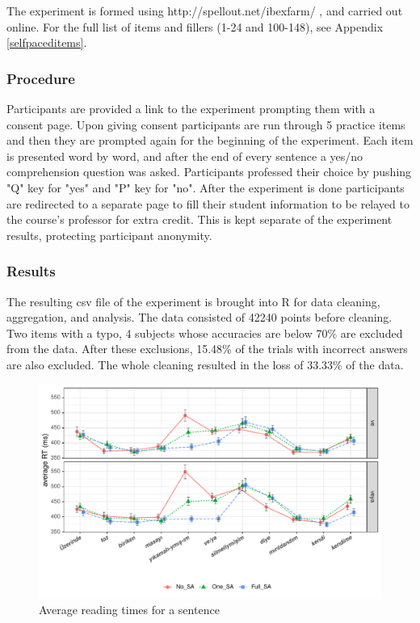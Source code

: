 The experiment is formed using http://spellout.net/ibexfarm/ \citep{drummond2013ibex}, and carried out online. For the full list of items and fillers (1-24 and 100-148), see Appendix \ref{selfpaceditems}.

\subsubsection{Procedure}
Participants are provided a link to the experiment prompting them with a consent page. Upon giving consent participants are run through 5 practice items and then they are prompted again for the beginning of the experiment. Each item is presented word by word, and after the end of every sentence a yes/no comprehension question was asked. Participants professed their choice by pushing "Q" key for "yes" and "P" key for "no". After the experiment is done participants are redirected to a separate page to fill their student information to be relayed to the course's professor for extra credit. This is kept separate of the experiment results, protecting participant anonymity.

\subsubsection{Results}
The resulting csv file of the experiment is brought into R \citep{team2013r} for data cleaning, aggregation, and analysis.
The data consisted of 42240 points before cleaning. Two items with a typo, 4 subjects whose accuracies are below 70\% are excluded from the data. After these exclusions, 15.48\% of the trials with incorrect answers are also excluded. The whole cleaning resulted in the loss of 33.33\% of the data.

\begin{figure}[hbt!]
\centering
\begin{knitrout}
\color{fgcolor}
\includegraphics[width=\linewidth]{experiments/selfpaced/report/figure/secondplot-1.pdf} 

\end{knitrout}
\caption{Average reading times for a sentence}
\label{fig:averageRT}
\end{figure}


